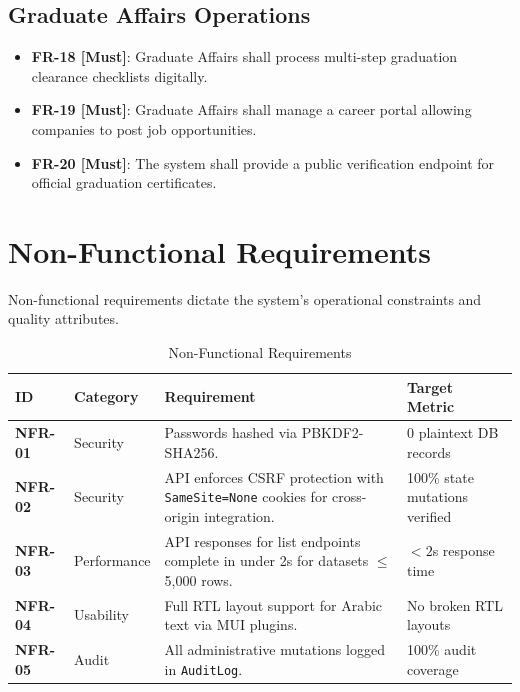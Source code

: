 \subsection{Graduate Affairs Operations}

\begin{itemize}
    \item \textbf{FR-18 [Must]}: Graduate Affairs shall process multi-step graduation clearance checklists digitally.
    \item \textbf{FR-19 [Must]}: Graduate Affairs shall manage a career portal allowing companies to post job opportunities.
    \item \textbf{FR-20 [Must]}: The system shall provide a public verification endpoint for official graduation certificates.
\end{itemize}

\section{Non-Functional Requirements}
\label{sec:non-functional-reqs}

Non-functional requirements dictate the system's operational constraints and quality attributes.

\begin{table}[H]
    \centering
    \renewcommand{\arraystretch}{1.3}
    \begin{tabular}{|p{}|p{}|p{}|p{}|}
        \hline
        \textbf{ID} & \textbf{Category} & \textbf{Requirement} & \textbf{Target Metric} \\
        \hline
        \textbf{NFR-01} & Security & Passwords hashed via PBKDF2-SHA256. & 0 plaintext DB records \\
        \hline
        \textbf{NFR-02} & Security & API enforces CSRF protection with \texttt{SameSite=None} cookies for cross-origin integration. & 100\% state mutations verified \\
        \hline
        \textbf{NFR-03} & Performance & API responses for list endpoints complete in under 2s for datasets $\leq$ 5,000 rows. & $<2$s response time \\
        \hline
        \textbf{NFR-04} & Usability & Full RTL layout support for Arabic text via MUI plugins. & No broken RTL layouts \\
        \hline
        \textbf{NFR-05} & Audit & All administrative mutations logged in \texttt{AuditLog}. & 100\% audit coverage \\
        \hline
    \end{tabular}
    \caption{Non-Functional Requirements}
    \label{tab:nfrs}
\end{table}

